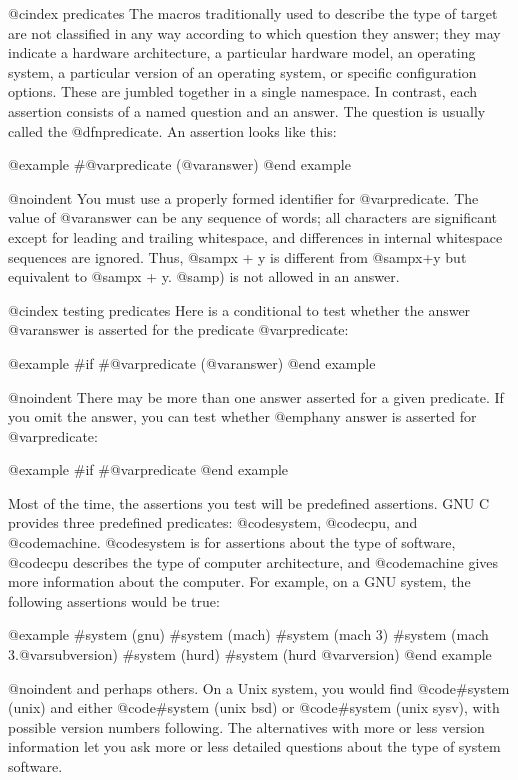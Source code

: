 {{@cindex predicates
The macros traditionally used to describe the type of target are not
classified in any way according to which question they answer; they may
indicate a hardware architecture, a particular hardware model, an
operating system, a particular version of an operating system, or
specific configuration options.  These are jumbled together in a single
namespace.  In contrast, each assertion consists of a named question and
an answer.  The question is usually called the @dfn{predicate}.
An assertion looks like this:

@example
#@var{predicate} (@var{answer})
@end example

@noindent
You must use a properly formed identifier for @var{predicate}.  The
value of @var{answer} can be any sequence of words; all characters are
significant except for leading and trailing whitespace, and differences
in internal whitespace sequences are ignored.  Thus, @samp{x + y} is
different from @samp{x+y} but equivalent to @samp{x + y}.  @samp{)} is
not allowed in an answer.

@cindex testing predicates
Here is a conditional to test whether the answer @var{answer} is asserted
for the predicate @var{predicate}:

@example
#if #@var{predicate} (@var{answer})
@end example

@noindent
There may be more than one answer asserted for a given predicate.  If
you omit the answer, you can test whether @emph{any} answer is asserted
for @var{predicate}:

@example
#if #@var{predicate}
@end example

Most of the time, the assertions you test will be predefined assertions.
GNU C provides three predefined predicates: @code{system}, @code{cpu},
and @code{machine}.  @code{system} is for assertions about the type of
software, @code{cpu} describes the type of computer architecture, and
@code{machine} gives more information about the computer.  For example,
on a GNU system, the following assertions would be true:

@example
#system (gnu)
#system (mach)
#system (mach 3)
#system (mach 3.@var{subversion})
#system (hurd)
#system (hurd @var{version})
@end example

@noindent
and perhaps others.  On a Unix system, you would find @code{#system
(unix)} and either @code{#system (unix bsd)} or @code{#system (unix
sysv)}, with possible version numbers following.  The alternatives with
more or less version information let you ask more or less detailed
questions about the type of system software.

}}
